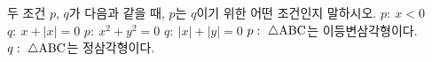 두 조건 $p$, $q$가 다음과 같을 때, $p$는 $q$이기 위한 어떤 조건인지 말하시오. 
 $p:\ x<0$ \hspace{3em} $q:\ x+|x|=0$
 $p:\ x^2+y^2=0$ \hspace{3em} $q:\ |x|+|y|=0$
 $p:\ \triangle\mathrm{ABC}$는 이등변삼각형이다.\\ $q:\ \triangle\mathrm{ABC}$는 정삼각형이다.
